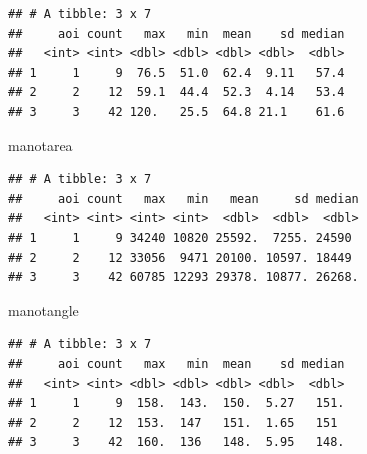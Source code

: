 \documentclass[
]{article}
\newenvironment{Shaded}{\begin{snugshade}}{\end{snugshade}}
\newcommand{\NormalTok}[1]{#1}
\begin{document}
\begin{verbatim}
## # A tibble: 3 x 7
##     aoi count   max   min  mean    sd median
##   <int> <int> <dbl> <dbl> <dbl> <dbl>  <dbl>
## 1     1     9  76.5  51.0  62.4  9.11   57.4
## 2     2    12  59.1  44.4  52.3  4.14   53.4
## 3     3    42 120.   25.5  64.8 21.1    61.6
\end{verbatim}

\begin{Shaded}
\begin{Highlighting}[]
\NormalTok{manotarea}
\end{Highlighting}
\end{Shaded}

\begin{verbatim}
## # A tibble: 3 x 7
##     aoi count   max   min   mean     sd median
##   <int> <int> <int> <int>  <dbl>  <dbl>  <dbl>
## 1     1     9 34240 10820 25592.  7255. 24590 
## 2     2    12 33056  9471 20100. 10597. 18449 
## 3     3    42 60785 12293 29378. 10877. 26268.
\end{verbatim}

\begin{Shaded}
\begin{Highlighting}[]
\NormalTok{manotangle}
\end{Highlighting}
\end{Shaded}

\begin{verbatim}
## # A tibble: 3 x 7
##     aoi count   max   min  mean    sd median
##   <int> <int> <dbl> <dbl> <dbl> <dbl>  <dbl>
## 1     1     9  158.  143.  150.  5.27   151.
## 2     2    12  153.  147   151.  1.65   151 
## 3     3    42  160.  136   148.  5.95   148.
\end{verbatim}
\end{document}

